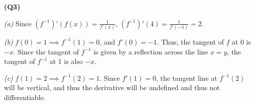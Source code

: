 \documentclass[12pt, a4paper]{article}
\begin{document}
\textbf{(Q3)}

\textit{(a)} Since $(f^{-1})'(f(x)) = \displaystyle{\frac{1}{f'(x)}}$,
$(f^{-1})'(4) = \displaystyle\frac{1}{f'(-1)} = 2$.

\textit{(b)} $f(0) = 1 \implies f^{-1}(1) = 0$, and $f'(0) = -1.$ Thus,
the tangent of $f$ at 0 is $-x$. Since the tangent of $f^{-1}$ is given 
by a reflection across the line $x = y$, the tangent of $f^{-1}$ at 1
is also $-x$.

\textit{(c)} $f(1) = 2 \implies f^{-1}(2) = 1$. Since $f'(1) = 0$,
the tangent line at $f^{-1}(2)$ will be vertical, and thus the derivative
will be undefined and thus not differentiable.
\end{document}
